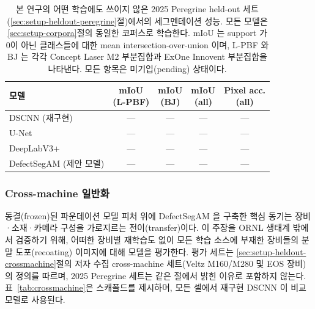 \begin{table}[t]
\centering
\caption{본 연구의 어떤 학습에도 쓰이지 않은 2025 Peregrine held-out
세트(\ref{sec:setup-heldout-peregrine}절)에서의 세그멘테이션 성능. 모든
모델은 \ref{sec:setup-corpora}절의 동일한 코퍼스로 학습한다. mIoU 는
support 가 0이 아닌 클래스들에 대한 mean intersection-over-union 이며,
L-PBF 와 BJ 는 각각 Concept Laser M2 부분집합과 ExOne Innovent 부분집합을
나타낸다. 모든 항목은
미기입(pending) 상태이다. }
\label{tab:heldout-main}
\footnotesize
\begin{tabular}{lcccc}
\toprule
모델 & \makecell{mIoU\\(L-PBF)} & \makecell{mIoU\\(BJ)} & \makecell{mIoU\\(all)} & \makecell{Pixel acc.\\(all)} \\
\midrule
DSCNN (재구현)~\cite{Scime2020DSCNN} & --- & --- & --- & --- \\
U-Net~\cite{Ronneberger2015UNet}            & --- & --- & --- & --- \\
DeepLabV3+~\cite{Chen2018DeepLabV3Plus}     & --- & --- & --- & --- \\
DefectSegAM (제안 모델)                     & --- & --- & --- & --- \\
\bottomrule
\end{tabular}
\end{table}

\subsubsection{Cross-machine 일반화}
\label{sec:results-crossmachine}

동결(frozen)된 파운데이션 모델 피처 위에 DefectSegAM 을 구축한 핵심 동기는
장비·소재·카메라 구성을 가로지르는 전이(transfer)이다. 이 주장을 ORNL
생태계 밖에서 검증하기 위해, 어떠한 장비별 재학습도 없이 모든 학습 소스에
부재한 장비들의 분말 도포(recoating) 이미지에 대해 모델을 평가한다. 평가
세트는 \ref{sec:setup-heldout-crossmachine}절의 저자 수집 cross-machine
세트(Veltz M160/M280 및 EOS 장비)의 정의를 따르며, 2025 Peregrine 세트는
같은 절에서 밝힌 이유로 포함하지 않는다.
표~\ref{tab:crossmachine}은 스캐폴드를 제시하며, 모든 셀에서 재구현
DSCNN 이 비교 모델로 사용된다. 

